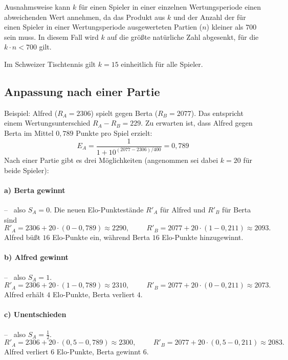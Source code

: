 Ausnahmsweise kann $k$ für einen Spieler in einer einzelnen Wertungsperiode einen abweichenden Wert annehmen, da das Produkt aus $k$ und der Anzahl der für einen Spieler in einer Wertungsperiode ausgewerteten Partien ($n$) kleiner als $700$ sein muss. In diesem Fall wird $k$ auf die größte natürliche Zahl abgesenkt, für die $k \cdot n < 700$ gilt.

Im Schweizer Tischtennis gilt $k = 15$ einheitlich für alle Spieler.


\subsection{Anpassung nach einer Partie}

Beispiel: Alfred ($R_{A} = 2306$) spielt gegen Berta ($R_{B} = 2077$). Das entspricht einem Wertungsunterschied $R_{A} - R_{B} = 229$. Zu erwarten ist, dass Alfred gegen Berta im Mittel $0,789$ Punkte pro Spiel erzielt:
\[
    E_{A} = \frac{1}{1 + 10^{(2077-2306) / 400}} = 0,789
\]
Nach einer Partie gibt es drei Möglichkeiten (angenommen sei dabei $k = 20$ für beide Spieler):

\paragraph{a) Berta gewinnt}-- \ also $S_{A} = 0$.
Die neuen Elo-Punktestände $R'_{A}$ für Alfred und $R'_{B}$ für Berta sind
\[
    R'_{A} = 2306 + 20 \cdot (0 - 0,789) \approx 2290, \hspace{1cm} R'_{B} = 2077 + 20 \cdot (1 - 0,211) \approx 2093.
\]
Alfred büßt $16$ Elo-Punkte ein, während Berta $16$ Elo-Punkte hinzugewinnt.

\paragraph{b) Alfred gewinnt}-- \ also $S_{A} = 1$.
\[
    R'_{A} = 2306 + 20 \cdot (1 - 0,789) \approx 2310, \hspace{1cm} R'_{B} = 2077 + 20 \cdot (0 - 0,211) \approx 2073.
\]
Alfred erhält $4$ Elo-Punkte, Berta verliert $4$.

\paragraph{c) Unentschieden}-- \ also $S_{A} = \frac{1}{2}$.
\[
    R'_{A} = 2306 + 20 \cdot (0,5 - 0,789) \approx 2300, \hspace{1cm} R'_{B} = 2077 + 20 \cdot (0,5 - 0,211) \approx 2083.
\]
Alfred verliert $6$ Elo-Punkte, Berta gewinnt $6$.


